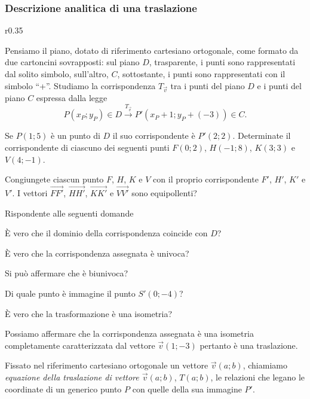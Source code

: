 \subsubsection{Descrizione analitica di una traslazione}

\setlength{\intextsep}{3pt plus 2.0pt minus 2.0pt}
\begin{wrapfigure}{r}{0.35\textwidth}
  \centering
\end{wrapfigure}
Pensiamo il piano, dotato di riferimento cartesiano ortogonale, come 
formato da due cartoncini sovrapposti: sul piano $D$, trasparente, i 
punti sono rappresentati dal solito simbolo, sull'altro, $C$, 
sottostante, i punti sono rappresentati con il simbolo ``+''.
Studiamo la corrispondenza $T_{\vec{v}}$ tra i punti del piano $D$ e 
i punti del piano $C$ espressa dalla legge
\[P(x_P;y_P)\in D \overset{T_{\vec{v}}}\rightarrow 
P'(x_P+1;y_P+(-3))\in C.\]

Se $P(1;5)$ è un punto di $D$ il suo corrispondente è $P'(2;2)$. 
Determinate il corrispondente di ciascuno dei seguenti punti 
$F(0;2)$, $H(-1;8)$, $K(3;3)$ e $V(4;-1)$.

Congiungete ciascun punto $F$, $H$, $K$ e $V$ con il proprio 
corrispondente $F'$, $H'$, $K'$ e $V'$. I vettori 
$\overrightarrow{FF'}$, $\overrightarrow{HH'}$, 
$\overrightarrow{KK'}$ e $\overrightarrow{VV'}$ sono equipollenti?

Rispondente alle seguenti domande
\begin{itemize*}
  \item \`E vero che il dominio della corrispondenza coincide con $D$?
  \item \`E vero che la corrispondenza assegnata è univoca?
  \item Si può affermare che è biunivoca?
  \item Di quale punto è immagine il punto $S'(0;-4)$?
  \item \`E vero che la trasformazione è una isometria?
\end{itemize*}

Possiamo affermare che la corrispondenza assegnata è una isometria 
completamente caratterizzata dal vettore $\vec{v}(1;-3)$ pertanto è 
una traslazione.

\begin{definizione}
  Fissato nel riferimento cartesiano ortogonale un vettore 
  $\vec{v}(a;b)$, chiamiamo \emph{equazione della traslazione di 
    vettore $\vec{v}(a;b)$}, $T(a;b)$, le relazioni che legano le 
  coordinate di un generico punto $P$ con quelle della sua immagine 
  $P'$.
\end{definizione}

